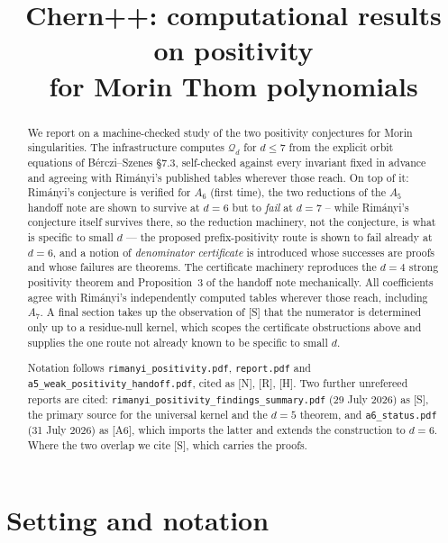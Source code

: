 \documentclass[11pt,a4paper]{article}
\title{\textbf{Chern++}: computational results on positivity\\[2pt]
       for Morin Thom polynomials}
\author{}
\date{}
\newcommand{\Qd}{\mathcal{Q}}
\theoremstyle{plain}
\theoremstyle{definition}
\theoremstyle{remark}
\begin{document}
\maketitle
\vspace{-2.4em}

\begin{abstract}
We report on a machine-checked study of the two positivity conjectures for Morin
singularities. The infrastructure computes $\Qd_d$ for $d \le 7$ from the explicit orbit
equations of B\'erczi--Szenes \S7.3, self-checked against every invariant fixed in advance and
agreeing with Rim\'anyi's published tables wherever those reach.
On top of it: Rim\'anyi's conjecture is verified for $A_6$ (first time), the two reductions of
the $A_5$ handoff note are shown to survive at $d = 6$ but to \emph{fail} at $d = 7$ -- while
Rim\'anyi's conjecture itself survives there, so the reduction machinery, not the conjecture, is
what is specific to small $d$ --- the proposed prefix-positivity route is shown to fail already at
$d = 6$, and a notion of \emph{denominator certificate} is
introduced whose successes are proofs and whose failures are theorems. The certificate
machinery reproduces the $d = 4$ strong positivity theorem and Proposition~3 of the handoff
note mechanically.  All coefficients agree with Rim\'anyi's independently computed tables
wherever those reach, including $A_7$. A final section takes up the observation of [S] that
the numerator is determined only up to a residue-null kernel, which scopes the certificate
obstructions above and supplies the one route not already known to be specific to small $d$.

Notation follows \texttt{rimanyi\_positivity.pdf},
\texttt{report.pdf} and \texttt{a5\_weak\_positivity\_handoff.pdf}, cited as [N], [R], [H].
Two further unrefereed reports are cited: \texttt{rimanyi\_positivity\_findings\_summary.pdf}
(29 July 2026) as [S], the primary source for the universal kernel and the $d = 5$ theorem,
and \texttt{a6\_status.pdf} (31 July 2026) as [A6], which imports the latter and extends the
construction to $d = 6$. Where the two overlap we cite [S], which carries the proofs.
\end{abstract}

\section{Setting and notation}
\end{document}
